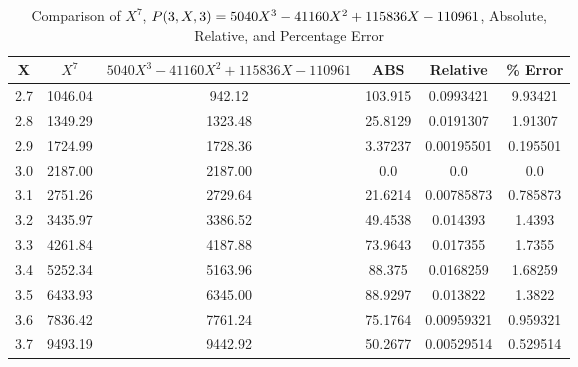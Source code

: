 ﻿\begin{table}[h!]
    \centering
    \caption{Comparison of $X^7$, ${P}(3,X,3) = 5040X^3 - 41160X^2 + 115836X - 110961$, Absolute, Relative, and Percentage Error}
    \begin{tabular}{|c|c|c|c|c|c|}
        \hline
        \textbf{X} & \textbf{$X^7$} & \textbf{$5040X^3 - 41160X^2 + 115836X - 110961$} & \textbf{ABS} & \textbf{Relative} & \textbf{\% Error} \\ \hline
        2.7        & 1046.04        & 942.12                                           & 103.915      & 0.0993421         & 9.93421           \\ \hline
        2.8        & 1349.29        & 1323.48                                          & 25.8129      & 0.0191307         & 1.91307           \\ \hline
        2.9        & 1724.99        & 1728.36                                          & 3.37237      & 0.00195501        & 0.195501          \\ \hline
        3.0        & 2187.00        & 2187.00                                          & 0.0          & 0.0               & 0.0               \\ \hline
        3.1        & 2751.26        & 2729.64                                          & 21.6214      & 0.00785873        & 0.785873          \\ \hline
        3.2        & 3435.97        & 3386.52                                          & 49.4538      & 0.014393          & 1.4393            \\ \hline
        3.3        & 4261.84        & 4187.88                                          & 73.9643      & 0.017355          & 1.7355            \\ \hline
        3.4        & 5252.34        & 5163.96                                          & 88.375       & 0.0168259         & 1.68259           \\ \hline
        3.5        & 6433.93        & 6345.00                                          & 88.9297      & 0.013822          & 1.3822            \\ \hline
        3.6        & 7836.42        & 7761.24                                          & 75.1764      & 0.00959321        & 0.959321          \\ \hline
        3.7        & 9493.19        & 9442.92                                          & 50.2677      & 0.00529514        & 0.529514          \\ \hline

\end{tabular}
\end{table}
